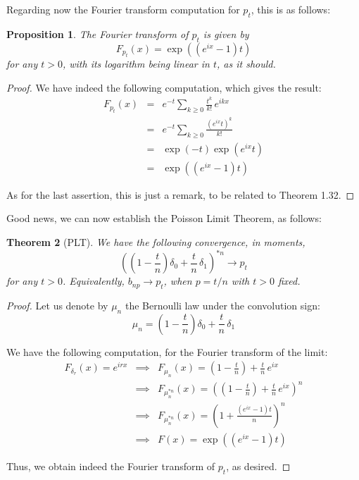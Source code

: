\documentclass[12pt]{amsbook}
\newtheorem{theorem}{Theorem}[chapter]
\newtheorem{proposition}[theorem]{Proposition}
\begin{document}
Regarding now the Fourier transform computation for $p_t$, this is as follows:


\begin{proposition}
The Fourier transform of $p_t$ is given by
$$F_{p_t}(x)=\exp\left((e^{ix}-1)t\right)$$
for any $t>0$, with its logarithm being linear in $t$, as it should.
\end{proposition}

\begin{proof}
We have indeed the following computation, which gives the result:
\begin{eqnarray*}
F_{p_t}(x)
&=&e^{-t}\sum_{k\geq0}\frac{t^k}{k!}\,e^{ikx}\\
&=&e^{-t}\sum_{k\geq0}\frac{(e^{ix}t)^k}{k!}\\
&=&\exp(-t)\exp(e^{ix}t)\\
&=&\exp\left((e^{ix}-1)t\right)
\end{eqnarray*}

As for the last assertion, this is just a remark, to be related to Theorem 1.32.
\end{proof}

Good news, we can now establish the Poisson Limit Theorem, as follows:


\begin{theorem}[PLT]
We have the following convergence, in moments,
$$\left(\left(1-\frac{t}{n}\right)\delta_0+\frac{t}{n}\,\delta_1\right)^{*n}\to p_t$$
for any $t>0$. Equivalently, $b_{np}\to p_t$, when $p=t/n$ with $t>0$ fixed.
\end{theorem}

\begin{proof}
Let us denote by $\mu_n$ the Bernoulli law under the convolution sign:
$$\mu_n=\left(1-\frac{t}{n}\right)\delta_0+\frac{t}{n}\,\delta_1$$

We have the following computation, for the Fourier transform of the limit: 
\begin{eqnarray*}
F_{\delta_r}(x)=e^{irx}
&\implies&F_{\mu_n}(x)=\left(1-\frac{t}{n}\right)+\frac{t}{n}\,e^{ix}\\
&\implies&F_{\mu_n^{*n}}(x)=\left(\left(1-\frac{t}{n}\right)+\frac{t}{n}\,e^{ix}\right)^n\\
&\implies&F_{\mu_n^{*n}}(x)=\left(1+\frac{(e^{ix}-1)t}{n}\right)^n\\
&\implies&F(x)=\exp\left((e^{ix}-1)t\right)
\end{eqnarray*}

Thus, we obtain indeed the Fourier transform of $p_t$, as desired.
\end{proof}
\end{document}
